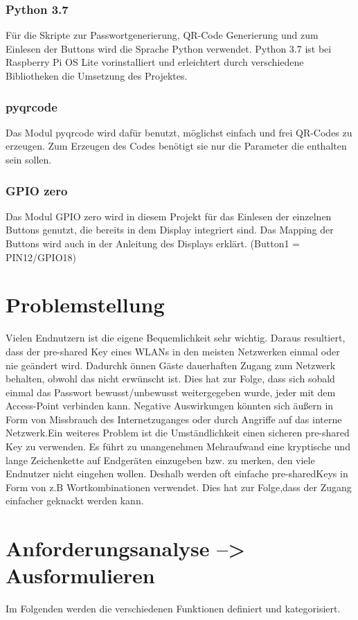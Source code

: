 \documentclass[a4paper,11pt,singlespacing]{article}
\begin{document}
    		\subsubsection{Python 3.7}
    			Für die Skripte zur Passwortgenerierung, QR-Code Generierung und zum Einlesen der Buttons wird die Sprache Python verwendet. Python 3.7 ist bei Raspberry Pi OS Lite  vorinstalliert und erleichtert durch verschiedene Bibliotheken die Umsetzung des Projektes.
    			\subsubsection{pyqrcode}
    				Das Modul pyqrcode wird dafür benutzt, möglichst einfach und frei QR-Codes zu erzeugen. Zum Erzeugen des Codes benötigt sie nur die Parameter die enthalten sein sollen.
    			\subsubsection{GPIO zero}
    				Das Modul GPIO zero wird in diesem Projekt für das Einlesen der einzelnen Buttons genutzt, die bereits in dem Display integriert sind. Das Mapping der Buttons wird auch in der Anleitung des Displays erklärt. (Button1 = PIN12/GPIO18) \cite{Quote_gpio_zero}
    	
    	
    \section{Problemstellung}
    	Vielen Endnutzern ist die eigene Bequemlichkeit sehr wichtig. Daraus resultiert, dass der pre-shared Key eines WLANs in den meisten Netzwerken einmal oder nie geändert wird. Dadurchk önnen Gäste dauerhaften Zugang zum Netzwerk behalten, obwohl das nicht erwünscht ist. Dies hat zur Folge, dass sich sobald einmal das Passwort bewusst/unbewusst weitergegeben wurde, jeder mit dem Access-Point verbinden kann. Negative Auswirkungen könnten sich äußern in Form von Missbrauch des Internetzuganges oder durch Angriffe auf das interne Netzwerk.Ein weiteres Problem ist die Umständlichkeit einen sicheren pre-shared Key zu verwenden. Es führt zu unangenehmen Mehraufwand eine kryptische und lange Zeichenkette auf Endgeräten einzugeben bzw. zu merken, den viele Endnutzer nicht eingehen wollen. Deshalb werden oft einfache pre-sharedKeys in Form von z.B Wortkombinationen verwendet. Dies hat zur Folge,dass der Zugang einfacher geknackt werden kann.
    	
    \section{Anforderungsanalyse --> Ausformulieren}
    		Im Folgenden werden die verschiedenen Funktionen definiert und kategorisiert.
\end{document}
